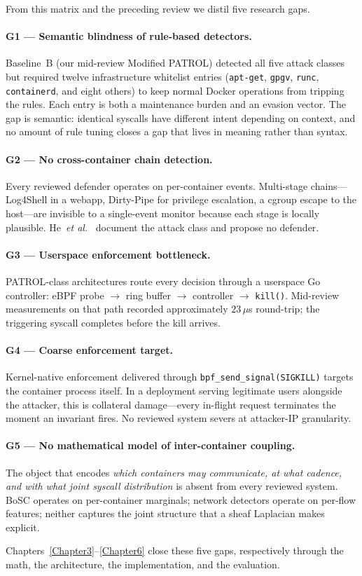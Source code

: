 From this matrix and the preceding review we distil five research gaps.

\paragraph{G1 --- Semantic blindness of rule-based detectors.}
Baseline~B (our mid-review Modified PATROL) detected all five attack classes
but required twelve infrastructure whitelist entries
(\texttt{apt-get}, \texttt{gpgv}, \texttt{runc}, \texttt{containerd}, and
eight others) to keep normal Docker operations from tripping the rules. Each
entry is both a maintenance burden and an evasion vector. The gap is
semantic: identical syscalls have different intent depending on context,
and no amount of rule tuning closes a gap that lives in meaning rather than
syntax.

\paragraph{G2 --- No cross-container chain detection.}
Every reviewed defender operates on per-container events. Multi-stage
chains---Log4Shell in a webapp, Dirty-Pipe for privilege escalation, a
cgroup escape to the host---are invisible to a single-event monitor because
each stage is locally plausible. He~\emph{et al.}~\cite{he2023cross}
document the attack class and propose no defender.

\paragraph{G3 --- Userspace enforcement bottleneck.}
PATROL-class architectures route every decision through a userspace Go
controller: eBPF probe $\rightarrow$ ring buffer $\rightarrow$ controller
$\rightarrow$ \texttt{kill()}. Mid-review measurements on that path
recorded approximately $23\,\mu$s round-trip; the triggering syscall
completes before the kill arrives.

\paragraph{G4 --- Coarse enforcement target.}
Kernel-native enforcement delivered through \texttt{bpf\_send\_signal(SIGKILL)}
targets the container process itself. In a deployment serving legitimate
users alongside the attacker, this is collateral damage---every in-flight
request terminates the moment an invariant fires. No reviewed system
severs at attacker-IP granularity.

\paragraph{G5 --- No mathematical model of inter-container coupling.}
The object that encodes \emph{which containers may communicate, at what
cadence, and with what joint syscall distribution} is absent from every
reviewed system. BoSC operates on per-container marginals; network
detectors operate on per-flow features; neither captures the joint
structure that a sheaf Laplacian makes explicit.

Chapters~\ref{Chapter3}--\ref{Chapter6} close these five gaps, respectively
through the math, the architecture, the implementation, and the evaluation.

